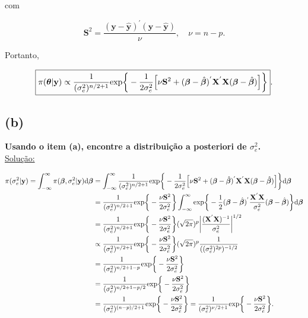 \documentclass[12pt, oldfontcommands]{article}\usepackage[]{graphicx}\usepackage[]{color}
\begin{document}
com

\[ \mathbf{S}^{2} =
   \frac{
    (\mathbf{y}-\hat{\mathbf{y}})^{'}(\mathbf{y}-\hat{\mathbf{y}})}{
    \nu}, \quad \nu = n - p. \]

Portanto,

\[ \boxed{\pi(\bm{\theta} | \mathbf{y}) \propto
    \frac{1}{(\sigma_{e}^{2})^{n/2 + 1}}
    {\rm exp}\bigg\{-\frac{1}{2\sigma_{e}^{2}}
    \Big[\nu \mathbf{S}^{2} + (\bm{\beta} - \hat{\bm{\beta}})^{'}
         \mathbf{X}^{'}\mathbf{X}(\bm{\beta} - \hat{\bm{\beta}})
    \Big]\bigg\}}. \]

\subsection*{(b)} 

\textbf{Usando o item (a), encontre a distribuição a posteriori de
        \(\sigma_{e}^{2}\).} \\

\underline{Solução:}

\vspace{-.18cm}

\begin{align}
\begin{split}
 \pi(\sigma_{e}^{2}|\mathbf{y}) =
 \int_{-\infty}^{\infty} \pi(\bm{\beta}, \sigma_{e}^{2}|\mathbf{y})
                         {\rm d}\bm{\beta} & =
 \int_{-\infty}^{\infty} \frac{1}{(\sigma_{e}^{2})^{n/2 + 1}}
  {\rm exp}\bigg\{-\frac{1}{2\sigma_{e}^{2}}
  \Big[\nu \mathbf{S}^{2} + (\bm{\beta} - \hat{\bm{\beta}})^{'}
  \mathbf{X}^{'}\mathbf{X}(\bm{\beta} - \hat{\bm{\beta}}) \Big]\bigg\}
 {\rm d}\bm{\beta} \\ & = \frac{1}{(\sigma_{e}^{2})^{n/2 + 1}}
 {\rm exp}\bigg\{-\frac{\nu \mathbf{S}^{2}}{2\sigma_{e}^{2}}\bigg\}
 \int_{-\infty}^{\infty} {\rm exp}\bigg\{-\frac{1}{2}
  (\bm{\beta} - \hat{\bm{\beta}})^{'}
  \frac{\mathbf{X}^{'}\mathbf{X}}{\sigma_{e}^{2}}
  (\bm{\beta} - \hat{\bm{\beta}})\bigg\}{\rm d}\bm{\beta} \\ & =
  \frac{1}{(\sigma_{e}^{2})^{n/2 + 1}}
 {\rm exp}\bigg\{-\frac{\nu \mathbf{S}^{2}}{2\sigma_{e}^{2}}\bigg\}
 (\sqrt{2\pi})^{p}
 \bigg|\frac{(\mathbf{X}^{'}\mathbf{X})^{-1}}{\sigma_{e}^{2}}\bigg|^{1/2}
 \\ & \propto \frac{1}{(\sigma_{e}^{2})^{n/2 + 1}}
 {\rm exp}\bigg\{-\frac{\nu \mathbf{S}^{2}}{2\sigma_{e}^{2}}\bigg\}
 (\sqrt{2\pi})^{p} \frac{1}{((\sigma_{e}^{2})^{2p})^{-1/2}} \\ & =
 \frac{1}{(\sigma_{e}^{2})^{n/2 + 1 - p}}
 {\rm exp}\bigg\{-\frac{\nu \mathbf{S}^{2}}{2\sigma_{e}^{2}}\bigg\} \\
 & = \frac{1}{(\sigma_{e}^{2})^{n/2 + 1 - p/2}}
 {\rm exp}\bigg\{-\frac{\nu \mathbf{S}^{2}}{2\sigma_{e}^{2}}\bigg\}
 \label{eq:2.b} \\ & = \frac{1}{(\sigma_{e}^{2})^{(n - p)/2 + 1}}
 {\rm exp}\bigg\{-\frac{\nu \mathbf{S}^{2}}{2\sigma_{e}^{2}}\bigg\} =
 \frac{1}{(\sigma_{e}^{2})^{\nu/2 + 1}}
 {\rm exp}\bigg\{-\frac{\nu \mathbf{S}^{2}}{2\sigma_{e}^{2}}\bigg\}.
\end{split}
\end{align}
\end{document}

